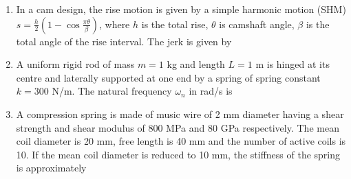 \documentclass[journal,12pt,onecolumn]{IEEEtran}
\begin{document}
\begin{enumerate}
    \item In a cam design, the rise motion is given by a simple harmonic motion (SHM) $s=\frac{h}{2}(1-\cos\frac{\pi\theta}{\beta})$, where $h$ is the total rise, $\theta$ is camshaft angle, $\beta$ is the total angle of the rise interval. The jerk is given by\\

          \begin{enumerate}
          \end{enumerate}

    \item A uniform rigid rod of mass $m=1$ kg and length $L=1$ m is hinged at its centre and laterally supported at one end by a spring of spring constant $k=300$ N/m. The natural frequency $\omega_n$ in rad/s is\\

          \begin{enumerate}
          \end{enumerate}

    \item A compression spring is made of music wire of 2 mm diameter having a shear strength and shear modulus of 800 MPa and 80 GPa respectively. The mean coil diameter is 20 mm, free length is 40 mm and the number of active coils is 10. If the mean coil diameter is reduced to 10 mm, the stiffness of the spring is approximately\\

          \begin{enumerate}
          \end{enumerate}


\end{enumerate}
\end{document}
